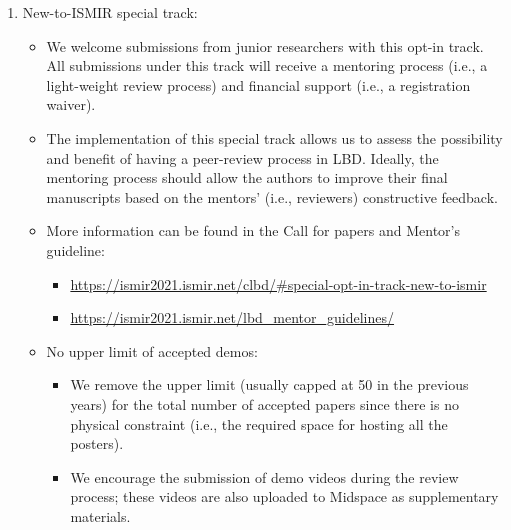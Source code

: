 \documentclass[%
10pt,								%
titlepage,						%
]
{scrartcl}
\begin{document}
            \begin{enumerate}
                \item New-to-ISMIR special track:
                    \begin{itemize}
                        \item We welcome submissions from junior researchers with this opt-in track. All submissions under this track will receive a mentoring process (i.e., a light-weight review process) and financial support (i.e., a registration waiver).

                        \item   The implementation of this special track allows us to assess the possibility and benefit of having a peer-review process in LBD. Ideally, the mentoring process should allow the authors to improve their final manuscripts based on the mentors' (i.e., reviewers) constructive feedback.  
                        \item   More information can be found in the Call for papers and Mentor's guideline: 
                            \begin{itemize}
                                \item \href{https://ismir2021.ismir.net/clbd/#special-opt-in-track-new-to-ismir}{https://ismir2021.ismir.net/clbd/\#special-opt-in-track-new-to-ismir}
                                \item \href{https://ismir2021.ismir.net/lbd_mentor_guidelines/}{https://ismir2021.ismir.net/lbd\_mentor\_guidelines/}
                            \end{itemize}

                        \item   No upper limit of accepted demos: 
                            \begin{itemize}
                                \item We remove the upper limit (usually capped at 50 in the previous years) for the total number of accepted papers since there is no physical constraint (i.e., the required space for hosting all the posters).

                                \item   We encourage the submission of demo videos during the review process; these videos are also uploaded to Midspace as supplementary materials. 
                            \end{itemize}
                    \end{itemize}
            \end{enumerate}
\end{document}
